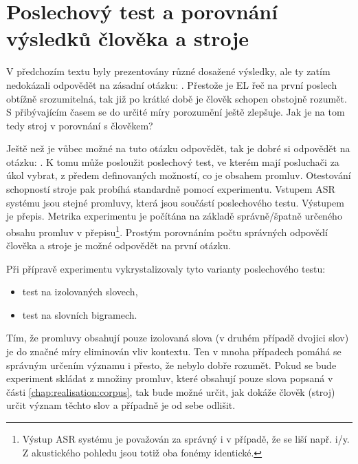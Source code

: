 \section{Poslechový test a porovnání výsledků člověka a stroje}
\label{chap:realisation:listening}

V předchozím textu byly prezentovány různé dosažené výsledky, ale ty zatím nedokázali odpovědět na zásadní otázku: . Přestože je EL řeč na první poslech obtížně srozumitelná, tak již po krátké době je člověk schopen obstojně rozumět. S přibývajícím časem se do určité míry porozumění ještě zlepšuje. Jak je na tom tedy stroj v porovnání s člověkem?

Ještě než je vůbec možné na tuto otázku odpovědět, tak je dobré si odpovědět na otázku: . K tomu může posloužit poslechový test, ve kterém mají posluchači za úkol vybrat, z předem definovaných možností, co je obsahem promluv. Otestování schopností stroje pak probíhá standardně pomocí experimentu. Vstupem ASR systému jsou stejné promluvy, která jsou součástí poslechového testu. Výstupem je přepis. Metrika experimentu je počítána na základě správně/špatně určeného obsahu promluv v přepisu\footnote{Výstup ASR systému je považován za správný i v případě, že se liší např. i/y. Z akustického pohledu jsou totiž oba fonémy identické.}. Prostým porovnáním počtu správných odpovědí člověka a stroje je možné odpovědět na první  otázku.

Při přípravě experimentu vykrystalizovaly tyto varianty poslechového testu:

\begin{itemize}
  \item test na izolovaných slovech,
  \item test na slovních bigramech.
\end{itemize}

\noindent Tím, že promluvy obsahují pouze izolovaná slova (v druhém případě dvojici slov) je do značné míry eliminován vliv kontextu. Ten v mnoha případech pomáhá se správným určením významu i přesto, že nebylo dobře rozumět. Pokud se bude experiment skládat z množiny promluv, které obsahují pouze slova popsaná v části \ref{chap:realisation:corpus}, tak bude možné určit, jak  dokáže člověk (stroj) určit význam těchto slov a případně je od sebe odlišit.

